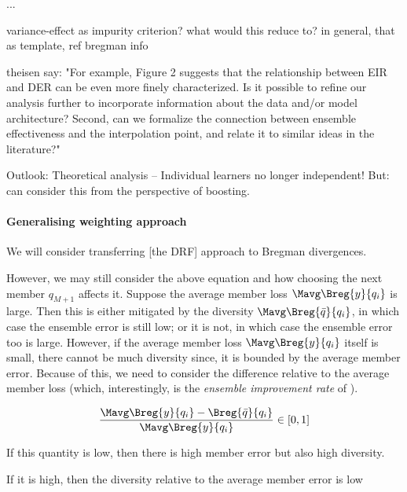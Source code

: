 \documentclass[
    a4paper, %
	fontsize=10pt, %
	twoside=false, %
]{kaobook}
\begin{document}
...

variance-effect as impurity criterion? what would this reduce to? in general, that as template, ref bregman info

theisen say:
"For example, Figure 2 suggests that the relationship between EIR and DER can be even more finely characterized. Is it
possible to refine our analysis further to incorporate information about the data and/or model architecture? Second,
can we formalize the connection between ensemble effectiveness and the interpolation point, and relate it to similar
ideas in the literature?"

Outlook: Theoretical analysis -- 
Individual learners no longer independent! But: can consider this from the perspective of boosting.

\paragraph{Generalising weighting approach}

We will consider transferring [the DRF] approach to Bregman divergences.

However, we may still consider the above equation and how choosing the next member $q_{M+1}$ affects it. Suppose the average member loss $\Mavg \Breg{y}{q_{i}}$ is large. Then this is either mitigated by the diversity $\Mavg \Breg{\bar{q}}{q_{i}}$, in which case the ensemble error is still low; or it is not, in which case the ensemble error too is large. 
However, if the average member loss $\Mavg\Breg{y}{q_i}$ itself is small, there cannot be much diversity since, it is bounded by the average member error.  Because of this, we need to consider the difference relative to the average member loss (which, interestingly, is the \textit{ensemble improvement rate} of \cite{theisen}).

$$
\frac{
\Mavg \Breg{y}{q_{i}} - \Breg{\bar{q}}{q_{i}}
}{
\Mavg \Breg{y}{q_i}
}
\in [0,1]
$$


If this quantity is low, then there is high member error but also high diversity. 

If it is high, then the diversity relative to the average member error is low 
\end{document}
